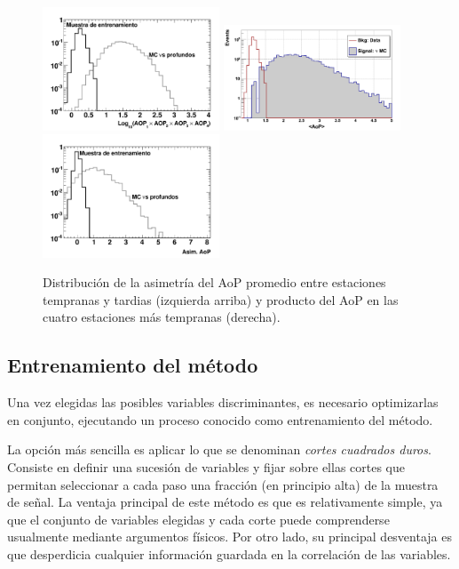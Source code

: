 	\begin{figure}
	\begin{center}
	\includegraphics[width=0.47\textwidth]{fig/seleccionAuger/aop_prod.pdf} \hfill
	\includegraphics[width=0.47\textwidth]{fig/seleccionAuger/trainning_withMCSimple_log_forThesis}\\
	\includegraphics[width=0.47\textwidth]{fig/seleccionAuger/asim.pdf}
	
	\caption{Distribución de la asimetría del AoP promedio entre estaciones tempranas y tardias (izquierda arriba) y producto del AoP en las cuatro estaciones más tempranas (derecha).}
	\label{fig:observablesGlobales}
	\end{center}
	\end{figure}
	\subsection{Entrenamiento del método}
	
	Una vez elegidas las posibles variables discriminantes, es necesario optimizarlas en conjunto, ejecutando un proceso conocido como entrenamiento del método.
	
	La opción más sencilla es aplicar lo que se denominan \emph{cortes cuadrados duros}.
	Consiste en definir una sucesión de variables y fijar sobre ellas cortes que permitan seleccionar a cada paso una fracción (en principio alta) de la muestra de señal.
	La ventaja principal de este método es que es relativamente simple, ya que el conjunto de variables elegidas y cada corte puede comprenderse usualmente mediante argumentos físicos.
	Por otro lado, su principal desventaja es que desperdicia cualquier información guardada en la correlación de las variables.
	
